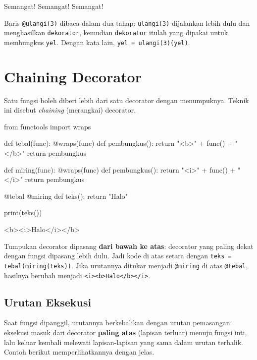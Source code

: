 \begin{keluaran}
Semangat!
Semangat!
Semangat!
\end{keluaran}

Baris \texttt{@ulangi(3)} dibaca dalam dua tahap: \texttt{ulangi(3)} dijalankan lebih dulu dan menghasilkan \texttt{dekorator}, kemudian \texttt{dekorator} itulah yang dipakai untuk membungkus \texttt{yel}. Dengan kata lain, \texttt{yel = ulangi(3)(yel)}.

\section{Chaining Decorator}

Satu fungsi boleh diberi lebih dari satu decorator dengan menumpuknya. Teknik ini disebut \emph{chaining} (merangkai) decorator.

\begin{kode}
from functools import wraps

def tebal(func):
    @wraps(func)
    def pembungkus():
        return "<b>" + func() + "</b>"
    return pembungkus

def miring(func):
    @wraps(func)
    def pembungkus():
        return "<i>" + func() + "</i>"
    return pembungkus

@tebal
@miring
def teks():
    return "Halo"

print(teks())
\end{kode}

\begin{keluaran}
<b><i>Halo</i></b>
\end{keluaran}

Tumpukan decorator dipasang \textbf{dari bawah ke atas}: decorator yang paling dekat dengan fungsi dipasang lebih dulu. Jadi kode di atas setara dengan \texttt{teks = tebal(miring(teks))}. Jika urutannya ditukar menjadi \texttt{@miring} di atas \texttt{@tebal}, hasilnya berubah menjadi \texttt{<i><b>Halo</b></i>}.

\subsection{Urutan Eksekusi}

Saat fungsi dipanggil, urutannya berkebalikan dengan urutan pemasangan: eksekusi masuk dari decorator \textbf{paling atas} (lapisan terluar) menuju fungsi inti, lalu keluar kembali melewati lapisan-lapisan yang sama dalam urutan terbalik. Contoh berikut memperlihatkannya dengan jelas.

